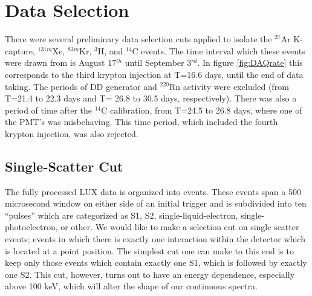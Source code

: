 \section{Data Selection}
There were several preliminary data selection cuts applied to isolate the $^{37}$Ar K-capture, $^{131m}$Xe, $^{83m}$Kr, $^{3}$H, and $^{14}$C events. The time interval which these events were drawn from is  August 17$^{th}$ until September 3$^{rd}$. In figure \ref{fig:DAQrate} this corresponds to the third krypton injection at T=16.6 days, until the end of data taking. The periods of DD generator and $^{220}$Rn activity were excluded (from T=21.4 to 22.3 days and T= 26.8 to 30.5 days, respectively). There was also a period of time after the $^{14}$C calibration, from T=24.5 to 26.8 days, where one of the PMT's was misbehaving. This time period, which included the fourth krypton injection, was also rejected.


\subsection{Single-Scatter Cut}
The fully processed LUX data is organized into events. These events span a 500 microsecond window on either side of an initial trigger and is subdivided into ten ``pulses'' which are categorized as S1, S2, single-liquid-electron, single-photoelectron, or other. We would like to make a selection cut on single scatter events; events in which there is exactly one interaction within the detector which is located at a point position. The simplest cut one can make to this end is to keep only those events which contain exactly one S1, which is followed by exactly one S2. This cut, however, turns out to have an energy dependence, especially above 100 keV, which will alter the shape of our continuous spectra. 

